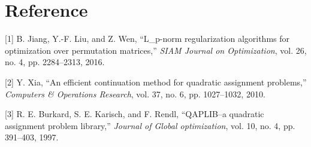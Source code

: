 \documentclass[
  10pt,
  a4paper,
,tablecaptionabove
]{scrartcl}
\newenvironment{cslreferences}%
  {}%
  {\par}
\begin{document}
\hypertarget{reference}{%
\section*{Reference}\label{reference}}

\hypertarget{refs}{}
\begin{cslreferences}
\leavevmode\hypertarget{ref-jiang_l_p-norm_2016}{}%
{[}1{]} B. Jiang, Y.-F. Liu, and Z. Wen, ``L\_p-norm regularization
algorithms for optimization over permutation matrices,'' \emph{SIAM
Journal on Optimization}, vol. 26, no. 4, pp. 2284--2313, 2016.

\leavevmode\hypertarget{ref-xia_efficient_2010}{}%
{[}2{]} Y. Xia, ``An efficient continuation method for quadratic
assignment problems,'' \emph{Computers \& Operations Research}, vol. 37,
no. 6, pp. 1027--1032, 2010.

\leavevmode\hypertarget{ref-burkard1997qaplib}{}%
{[}3{]} R. E. Burkard, S. E. Karisch, and F. Rendl, ``QAPLIB--a
quadratic assignment problem library,'' \emph{Journal of Global
optimization}, vol. 10, no. 4, pp. 391--403, 1997.
\end{cslreferences}
\end{document}
